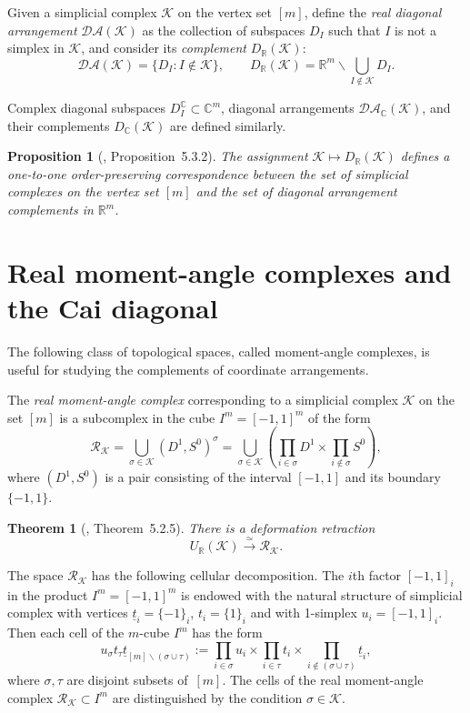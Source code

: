 \documentclass[a4paper,12pt]{amsart}
\newcommand{\K}{\mathcal K}
\newcommand{\RR}{\mathbb R}
\newcommand{\CC}{\mathbb C}
\newcommand{\R}{\mathcal R}
\newtheorem{theorem}[formula]{Theorem}
\newtheorem{proposition}[formula]{Proposition}
\theoremstyle{definition}
\theoremstyle{remark}
\numberwithin{equation}{section}
\begin{document}
Given a simplicial complex $\K$ on the vertex set $[m]$, define the \textit{real diagonal arrangement} $\mathcal{DA}(\K)$
as the collection of subspaces $D_I$ such that $I$ is not a simplex in $\K$, and consider its \emph{complement} $D_\RR(\K)$:
\[
  \mathcal{DA}(\K) = \{D_I \colon I \notin \K \},\qquad
  D_\RR(\K)=\RR^m \backslash \bigcup_{I \notin \K} D_I.
\]

Complex diagonal subspaces $D_I^\CC \subset \CC^m$, diagonal arrangements $\mathcal{DA}_\CC(\K)$, and their complements $D_\CC(\K)$
are defined similarly.

\begin{proposition}[\cite{BP00}, Proposition~5.3.2]
The assignment $\K \mapsto D_\RR(\K)$ defines a one-to-one order-preserving correspondence between the set 
of simplicial complexes on the vertex set $[m]$ and the set of diagonal arrangement complements in $\RR^m$.
\end{proposition}



\section{Real moment-angle complexes and the Cai diagonal}
The following class of topological spaces, called moment-angle complexes, is useful for studying the complements of coordinate arrangements.

The \textit{real moment-angle complex} corresponding to a simplicial complex $\K$ on the set $[m]$ is a subcomplex in the cube $I^m = [-1, 1]^m$ 
of the form
$$\R_\K = \bigcup_{\sigma \in \K} (D^1, S^0)^\sigma = \bigcup_{\sigma \in \K}\left({\prod_{i \in \sigma}D^1 \times \prod_{i \notin \sigma} S^0}\right),$$
where $(D^1, S^0)$ is a pair consisting of the interval $[-1, 1]$ and its boundary $\{-1, 1 \}$.

\begin{theorem}[\cite{BP00}, Theorem~5.2.5]
There is a deformation retraction
$$U_\RR(\K) \stackrel{\simeq}\to \R_\K.$$
\end{theorem}

The space $\R_\K$ has the following cellular decomposition. The $i$th factor $[-1, 1]_i$ in the product $I^m=[-1, 1]^m$ is endowed with the natural structure of simplicial complex with vertices
$\underline{t}_i = \{-1\}_i$, $t_i = \{ 1 \}_i$ and with 1-simplex $u_i = [-1, 1]_i$.
Then each cell of the $m$-cube $I^m$ has the form
\begin{equation}\label{basis}
u_\sigma t_\tau \underline{t}_{[m]\backslash (\sigma \cup \tau)} := \prod_{i \in \sigma} u_i \times \prod_{i \in \tau} t_i \times \prod_{i \notin (\sigma \cup \tau)} \underline{t}_i,
\end{equation}
where $\sigma,\tau$ are disjoint subsets of~$[m]$. The cells of the real moment-angle complex $\R_\K\subset I^m$ are distinguished by the condition $\sigma\in\K$.
\end{document}
